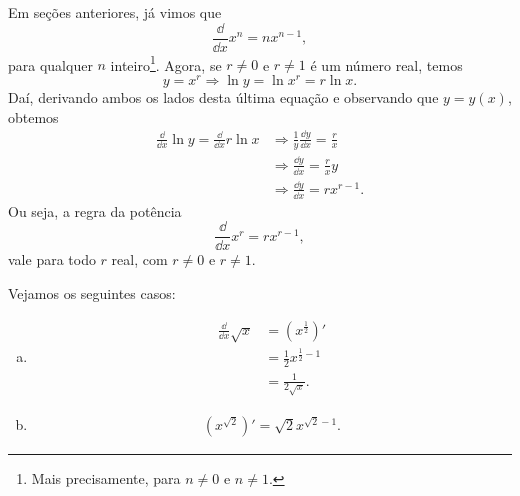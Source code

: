 \begin{obs}
  Em seções anteriores, já vimos que
  \begin{equation}
    \frac{\dd}{\dd x}x^n = nx^{n-1},
  \end{equation}
  para qualquer $n$ inteiro\footnote{Mais precisamente, para $n\neq 0$ e $n\neq 1$.}. Agora, se $r\neq 0$ e $r\neq 1$ é um número real, temos
  \begin{equation}
    y = x^r \Rightarrow \ln y = \ln x^r = r\ln x.
  \end{equation}
  Daí, derivando ambos os lados desta última equação e observando que $y = y(x)$, obtemos
  \begin{align}
    \frac{\dd}{\dd x} \ln y = \frac{\dd}{\dd x} r\ln x &\Rightarrow \frac{1}{y}\frac{\dd y}{\dd x} = \frac{r}{x}\\
                                                       &\Rightarrow \frac{\dd y}{\dd x} = \frac{r}{x}y\\
                                                       &\Rightarrow \frac{\dd y}{\dd x} = rx^{r-1}.
  \end{align}
  Ou seja, a regra da potência
  \begin{equation}
    \frac{\dd}{\dd x}x^r = rx^{r-1},
  \end{equation}
  vale para todo $r$ real, com $r\neq 0$ e $r\neq 1$.
\end{obs}

\begin{ex}
  Vejamos os seguintes casos:
  \begin{enumerate}[a)]
  \item
    \begin{align}
      \frac{\dd}{\dd x}\sqrt{x} &= \left(x^{\frac{1}{2}}\right)' \\
                                &= \frac{1}{2}x^{\frac{1}{2}-1} \\
                                &= \frac{1}{2\sqrt{x}}.
    \end{align}
  \item
    \begin{align}
      \left(x^{\sqrt{2}}\right)' = \sqrt{2}x^{\sqrt{2}-1}.
    \end{align}
  \end{enumerate}
\end{ex}

